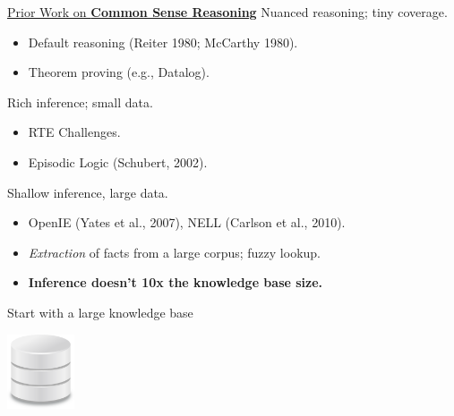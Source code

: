 \begin{frame}{\uline{Prior Work on \textbf{Common Sense Reasoning}}}
 Nuanced reasoning; tiny coverage.
\begin{itemize}
  \item Default reasoning (Reiter 1980; McCarthy 1980).
  \item Theorem proving (e.g., Datalog).
\end{itemize}
\vspace{0.5cm}
\pause

 Rich inference; small data.
\begin{itemize}
  \item RTE Challenges.
  \item Episodic Logic (Schubert, 2002).
\end{itemize}
\vspace{0.5cm}
\pause

 Shallow inference, large data.
\begin{itemize}
  \item OpenIE (Yates et al., 2007), NELL (Carlson et al., 2010).
  \item \textit{Extraction} of facts from a large corpus; fuzzy lookup.
  \pause
  \item \textbf{Inference doesn't 10x the knowledge base size.}
\end{itemize}
\end{frame}


\begin{frame}{Start with a large knowledge base}
\begin{center}
  \hspace{0.8cm}
  \includegraphics[height=2.2cm]{../../img/database.png}
\end{center}
\end{frame}

